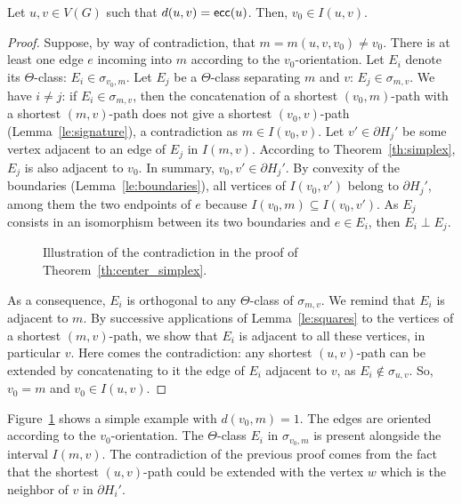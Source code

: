 \documentclass[a4paper,UKenglish,numberwithinsect,cleveref, autoref,anonymous]{lipics-v2021}
\newcommand{\ecc}{\mbox{\textsf{ecc}}}
\begin{document}
\begin{theorem}
Let $u,v \in V(G)$ such that $d(u,v) = \ecc(u)$. Then, $v_0 \in I(u,v)$.
\label{th:center_simplex}
\end{theorem}
\begin{proof}
Suppose, by way of contradiction, that $m = m(u,v,v_0) \neq v_0$. There is at least one edge $e$ incoming into $m$ according to the $v_0$-orientation. Let $E_i$ denote its $\Theta$-class: $E_i \in \sigma_{v_0,m}$. Let $E_j$ be a $\Theta$-class separating $m$ and $v$: $E_j \in \sigma_{m,v}$. We have $i \neq j$: if $E_i \in \sigma_{m,v}$, then the concatenation of a shortest $(v_0,m)$-path with a shortest $(m,v)$-path does not give a shortest $(v_0,v)$-path (Lemma~\ref{le:signature}), a contradiction as $m \in I(v_0,v)$. Let $v' \in \partial H_j'$ be some vertex adjacent to an edge of $E_j$ in $I(m,v)$. According to Theorem~\ref{th:simplex}, $E_j$ is also adjacent to $v_0$. In summary, $v_0,v' \in \partial H_j'$. By convexity of the boundaries (Lemma~\ref{le:boundaries}), all vertices of $I(v_0,v')$ belong to $\partial H_j'$, among them the two endpoints of $e$ because $I(v_0,m) \subseteq I(v_0,v')$. As $E_j$ consists in an isomorphism between its two boundaries and $e \in E_i$, then $E_i \perp E_j$.

\begin{figure}[h]
\centering
\scalebox{0.8}{}
\caption{Illustration of the contradiction in the proof of Theorem~\ref{th:center_simplex}.}
\label{fig:center_simplex}
\end{figure}

As a consequence, $E_i$ is orthogonal to any $\Theta$-class of $\sigma_{m,v}$. We remind that $E_i$ is adjacent to $m$. By successive applications of Lemma~\ref{le:squares} to the vertices of a shortest $(m,v)$-path, we show that $E_i$ is adjacent to all these vertices, in particular $v$. 
Here comes the contradiction: any shortest $(u,v)$-path can be extended by concatenating to it the edge of $E_i$ adjacent to $v$, as $E_i \notin \sigma_{u,v}$. So, $v_0 = m$ and $v_0 \in I(u,v)$. 
\end{proof}

Figure~\ref{fig:center_simplex} shows a simple example with $d(v_0,m) = 1$. The edges are oriented according to the $v_0$-orientation. The $\Theta$-class $E_i$ in $\sigma_{v_0,m}$ is present alongside the interval $I(m,v)$. The contradiction of the previous proof comes from the fact that the shortest $(u,v)$-path could be extended with the vertex $w$ which is the neighbor of $v$ in $\partial H_i'$.
\end{document}
